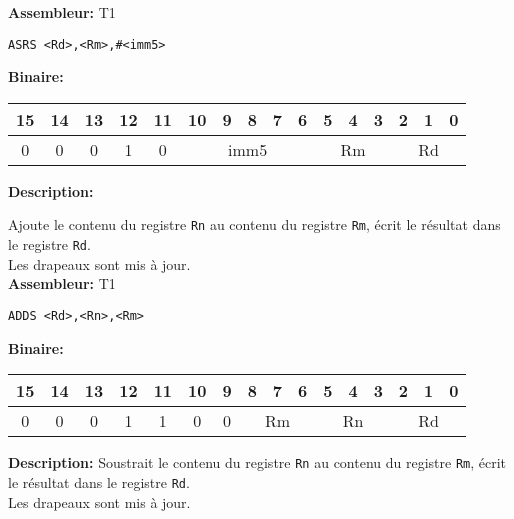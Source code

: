\textbf{Assembleur:} T1

\begin{lstlisting}
ASRS <Rd>,<Rm>,#<imm5>
\end{lstlisting}

\textbf{Binaire:}\\

\begin{tabular}{| c c c c c c c c c c c c c c c c |}
\hline
15 & 14 & 13 & \multicolumn{1}{|c}{12} & 11 & \multicolumn{1}{|c}{10} & 9 & 8 & 7 & 6 & \multicolumn{1}{|c}{5} & 4 & 3 & \multicolumn{1}{|c}{2} & 1 & 0 \\
\hline   
0 & 0 & 0 & \multicolumn{1}{|c}{1} & 0 & \multicolumn{5}{|c|}{imm5} & \multicolumn{3}{|c|}{Rm} & \multicolumn{3}{|c|}{Rd} \\
\hline
\end{tabular}



\textbf{Description: }

Ajoute le contenu du registre \texttt{Rn} au contenu du registre \texttt{Rm}, écrit le résultat dans le registre \texttt{Rd}.\\
Les drapeaux sont mis à jour.\\

\textbf{Assembleur:} T1

\begin{lstlisting}
ADDS <Rd>,<Rn>,<Rm>
\end{lstlisting}

\textbf{Binaire:}\\

\begin{tabular}{| c c c c c c c c c c c c c c c c |}
\hline
15 & 14 & 13 & \multicolumn{1}{|c}{12} & 11 & \multicolumn{1}{|c}{10} & \multicolumn{1}{|c}{9} & \multicolumn{1}{|c}{8} & 7 & 6 & \multicolumn{1}{|c}{5} & 4 & 3 & \multicolumn{1}{|c}{2} & 1 & 0 \\
\hline   
0 & 0 & 0 & \multicolumn{1}{|c}{1} & 1 &  \multicolumn{1}{|c}{0} & \multicolumn{1}{|c}{0} & \multicolumn{3}{|c|}{Rm} & \multicolumn{3}{|c|}{Rn} & \multicolumn{3}{|c|}{Rd} \\
\hline
\end{tabular}



\textbf{Description: }
Soustrait le contenu du registre \texttt{Rn} au contenu du registre \texttt{Rm}, écrit le résultat dans le registre \texttt{Rd}.\\
Les drapeaux sont mis à jour.\\

